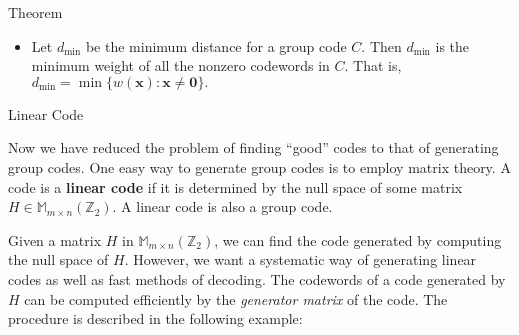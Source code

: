 \documentclass[final]{beamer}
\newcommand{\Z}{\mathbb{Z}}
\newlength{\colwidth}
\begin{document}
\begin{frame}[t]
\begin{columns}[t]
\begin{column}{\colwidth}
\begin{alertblock}{Theorem}
\begin{itemize}
            \noindent \textbf{\textit{Proof.}} Suppose that a codeword $\textbf{x}$ is transmitted and the word $\textbf{y}$ is received with at most $n$ error. Then $d(\textbf{x},\textbf{y}) \leq n$. Let $\textbf{z} \neq \textbf{x}$ be a codeword. Then $$2n + 1 \leq d(\textbf{x},\textbf{z}) \leq d(\textbf{x},\textbf{y}) + d(\textbf{y},\textbf{z}) \leq n + d(\textbf{y},\textbf{z}).$$ Hence, $d(\textbf{y},\textbf{z}) \geq n + 1$ and $\textbf{y}$ should be correctly decoded as $\textbf{x}$. Now suppose that $\textbf{x}$ is transmitted and $\textbf{y}$ is received with at least one error and at most $2n$ error, i.e., $1 \leq d(\textbf{x},\textbf{y}) \leq 2n$. Then $\textbf{y}$ cannot be a codeword since the minimum distance is $2n+1$. Hence, the code can detect up to $2n$ errors. 
      \item Let $d_{\min}$ be the minimum distance for a group code $C$. Then $d_{\min}$ is the minimum weight of all the nonzero codewords in $C$. That is, $d_{\min} = \min\{w(\textbf{x}) : \textbf{x} \neq \textbf{0}\}.$
    \end{itemize}
  \end{alertblock}

  \vspace{-8mm}
  
  \begin{block}{Linear Code}

    Now we have reduced the problem of finding ``good'' codes to that of generating group codes. One easy way to generate group codes is to employ matrix theory. 
    A code is a \textbf{linear code} if it is determined by the null space of some matrix $H \in \mathbb{M}_{m \times n}(\Z_2)$. A linear code is also a group code.

    Given a matrix $H$ in $\mathbb{M}_{m \times n}(\Z_2)$, we can find the code generated by computing the null space of $H$. However, we want a systematic way of generating linear codes as well as fast methods of decoding. The codewords of a code generated by $H$ can be computed efficiently by the \textit{generator matrix} of the code. The procedure is described in the following example: 


\end{block}
\end{column}
\end{columns}
\end{frame}
\end{document}
